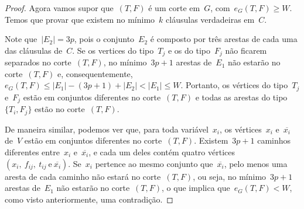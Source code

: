 \begin{proof}



		\bigskip
		\bigskip

		
		Agora vamos supor 
		que~$(T,F)$ é um corte em~$G$,
		com~$e_G(T,F)\ge W$.
		Temos que provar que
		existem no mínimo~$k$ cláusulas verdadeiras em~$C$.

		Note que~${|E_2| = 3}p$, pois o conjunto~$E_2$ é composto por 
		três arestas
		de cada uma das cláusulas de~$C$.  
		Se os vertices do tipo~$T_j$ e os do tipo~$F_j$ não
		ficarem separados no corte~$(T,F)$,
		no mínimo~${3p+1}$ arestas de~$E_1$ não estarão
		no corte~$(T,F)$ e, 
		consequentemente,~${e_G(T,F)\le |E_1|-(3p+1)+|E_2|< |E_1| \le W}$. 
		Portanto, os vértices do tipo~$T_j$ e~$F_j$
		estão em conjuntos diferentes no corte~$(T,F)$
		e todas as arestas do tipo~$\{T_i,F_j\}$ estão no
		corte~$(T,F)$.

		De maneira similar, podemos ver que, para toda 
		variável~$x_i$, os vértices~$x_i$ e~$\overline{x_i}$
		de~$V$ estão em conjuntos diferentes no corte~$(T,F)$.
		Existem~$3p+1$ caminhos diferentes entre~$x_i$
		e~$\overline{x_i}$, e cada um deles contém quatro
		vértices~${(x_i,\ f_{ij},\ t_{ij} \ \text{e}\ \overline{x_i})}$.
		Se~$x_i$ pertence ao mesmo conjunto que~$\overline{x_i}$,
		pelo menos uma aresta de cada caminho não estará
		no corte~$(T,F)$, ou seja, no mínimo~$3p+1$ arestas
		de~$E_1$ não estarão no corte~$(T,F)$, o que
		implica que~${e_G(T,F)< W}$, como visto anteriormente,
		uma contradição.


\end{proof}

